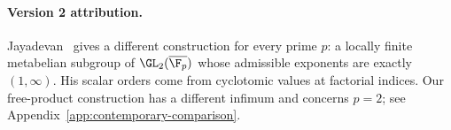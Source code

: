 
\paragraph{Version 2 attribution.}
Jayadevan~\cite{jayadevan-21-121a} gives a different construction
for every prime \(p\): a locally finite metabelian subgroup of
\(\GL_2(\overline{\F_p})\) whose admissible exponents are exactly
\((1,\infty)\). His scalar orders come from cyclotomic values at
factorial indices. Our free-product construction has a different
infimum and concerns \(p=2\); see Appendix~\ref{app:contemporary-comparison}.
